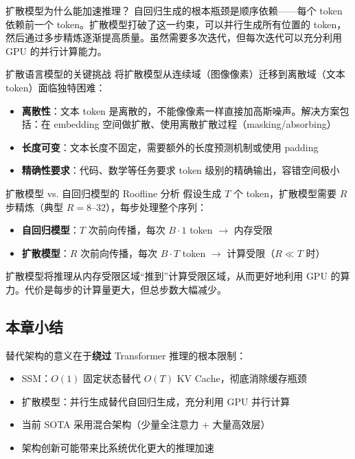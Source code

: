 \documentclass[a4paper]{article}
\begin{document}
\begin{knowledgebox}{扩散模型为什么能加速推理？}
自回归生成的根本瓶颈是顺序依赖——每个 token 依赖前一个 token。扩散模型打破了这一约束，可以并行生成所有位置的 token，然后通过多步精炼逐渐提高质量。虽然需要多次迭代，但每次迭代可以充分利用 GPU 的并行计算能力。
\end{knowledgebox}

\begin{importantbox}{扩散语言模型的关键挑战}
将扩散模型从连续域（图像像素）迁移到离散域（文本 token）面临独特困难：
\begin{itemize}
    \item \textbf{离散性}：文本 token 是离散的，不能像像素一样直接加高斯噪声。解决方案包括：在 embedding 空间做扩散、使用离散扩散过程（masking/absorbing）
    \item \textbf{长度可变}：文本长度不固定，需要额外的长度预测机制或使用 padding
    \item \textbf{精确性要求}：代码、数学等任务要求 token 级别的精确输出，容错空间极小
\end{itemize}
\end{importantbox}

\begin{knowledgebox}{扩散模型 vs. 自回归模型的 Roofline 分析}
假设生成 $T$ 个 token，扩散模型需要 $R$ 步精炼（典型 $R=8$--$32$），每步处理整个序列：
\begin{itemize}
    \item \textbf{自回归模型}：$T$ 次前向传播，每次 $B \cdot 1$ token $\rightarrow$ 内存受限
    \item \textbf{扩散模型}：$R$ 次前向传播，每次 $B \cdot T$ token $\rightarrow$ 计算受限（$R \ll T$ 时）
\end{itemize}
扩散模型将推理从内存受限区域``推到''计算受限区域，从而更好地利用 GPU 的算力。代价是每步的计算量更大，但总步数大幅减少。
\end{knowledgebox}

\subsection{本章小结}

替代架构的意义在于\textbf{绕过} Transformer 推理的根本限制：
\begin{itemize}
    \item SSM：$O(1)$ 固定状态替代 $O(T)$ KV Cache，彻底消除缓存瓶颈
    \item 扩散模型：并行生成替代自回归生成，充分利用 GPU 并行计算
    \item 当前 SOTA 采用混合架构（少量全注意力 + 大量高效层）
    \item 架构创新可能带来比系统优化更大的推理加速
\end{itemize}
\end{document}
